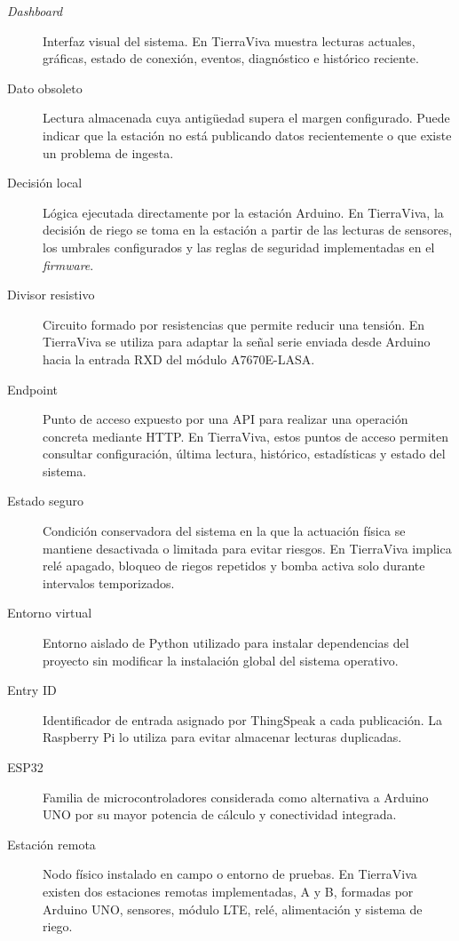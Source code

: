 \begin{description}
    \item[\textit{Dashboard}]
    Interfaz visual del sistema. En TierraViva muestra lecturas actuales, gráficas, estado de conexión, eventos, diagnóstico e histórico reciente.

    \item[Dato obsoleto]
    Lectura almacenada cuya antigüedad supera el margen configurado. Puede indicar que la estación no está publicando datos recientemente o que existe un problema de ingesta.

    \item[Decisión local]
    Lógica ejecutada directamente por la estación Arduino. En TierraViva, la decisión de riego se toma en la estación a partir de las lecturas de sensores, los umbrales configurados y las reglas de seguridad implementadas en el \textit{firmware}.

    \item[Divisor resistivo]
    Circuito formado por resistencias que permite reducir una tensión. En TierraViva se utiliza para adaptar la señal serie enviada desde Arduino hacia la entrada RXD del módulo A7670E-LASA.

    \item[Endpoint]
    Punto de acceso expuesto por una API para realizar una operación concreta mediante HTTP. En TierraViva, estos puntos de acceso permiten consultar configuración, última lectura, histórico, estadísticas y estado del sistema.

    \item[Estado seguro]
    Condición conservadora del sistema en la que la actuación física se mantiene desactivada o limitada para evitar riesgos. En TierraViva implica relé apagado, bloqueo de riegos repetidos y bomba activa solo durante intervalos temporizados.

    \item[Entorno virtual]
    Entorno aislado de Python utilizado para instalar dependencias del proyecto sin modificar la instalación global del sistema operativo.

    \item[Entry ID]
    Identificador de entrada asignado por ThingSpeak a cada publicación. La Raspberry Pi lo utiliza para evitar almacenar lecturas duplicadas.

    \item[ESP32]
    Familia de microcontroladores considerada como alternativa a Arduino UNO por su mayor potencia de cálculo y conectividad integrada.

    \item[Estación remota]
    Nodo físico instalado en campo o entorno de pruebas. En TierraViva existen dos estaciones remotas implementadas, A y B, formadas por Arduino UNO, sensores, módulo LTE, relé, alimentación y sistema de riego.


\end{description}
